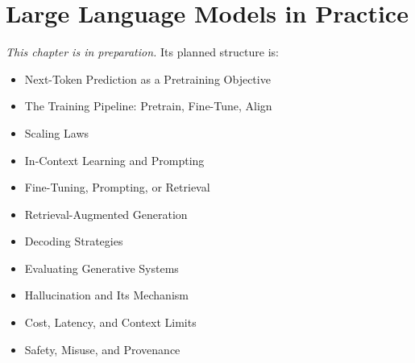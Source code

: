 
\chapter{Large Language Models in Practice}
\label{ch:ch19}

\noindent\textit{This chapter is in preparation.} Its planned structure is:

\begin{itemize}
  \item Next-Token Prediction as a Pretraining Objective
  \item The Training Pipeline: Pretrain, Fine-Tune, Align
  \item Scaling Laws
  \item In-Context Learning and Prompting
  \item Fine-Tuning, Prompting, or Retrieval
  \item Retrieval-Augmented Generation
  \item Decoding Strategies
  \item Evaluating Generative Systems
  \item Hallucination and Its Mechanism
  \item Cost, Latency, and Context Limits
  \item Safety, Misuse, and Provenance
\end{itemize}
